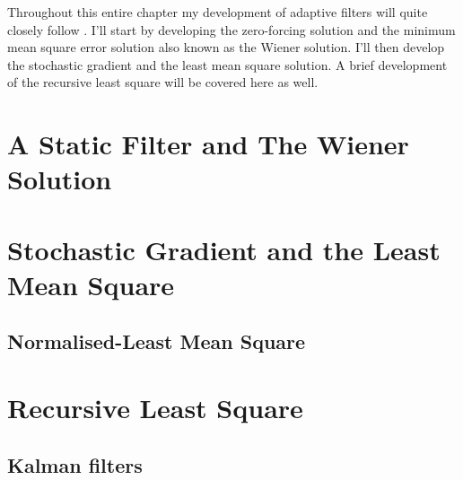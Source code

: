 Throughout this entire chapter my development of adaptive filters %
will quite closely follow \cite{Hay02}. I'll start by %
developing the zero-forcing solution and the minimum mean square %
error solution also known as the Wiener solution. I'll then develop %
the stochastic gradient and the least mean square solution. A brief %
development of the recursive least square will be covered here as %
well.

\section{A Static Filter and The Wiener Solution}



\section{Stochastic Gradient and the Least Mean Square}
\subsection{Normalised-Least Mean Square}

\section{Recursive Least Square}
\subsection{Kalman filters}  %

